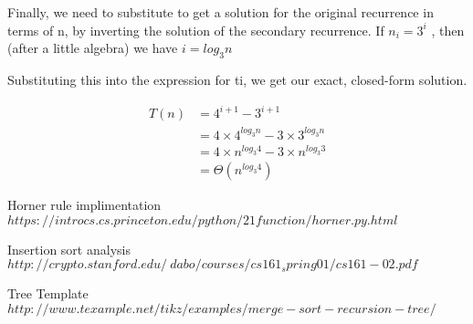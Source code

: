 \documentclass[5pt]{article}
\begin{document}
Finally, we need to substitute to get a solution for the original recurrence in terms of n, by inverting the solution of the secondary recurrence. If $n_i = 3^i $ , then (after a little algebra) we have $ i = log_3 n$

Substituting this into the expression for ti, we get our exact, closed-form solution.

\begin{align*}
T(n)  & = 4^{i+1} - 3^{i+1}  \\
& = 4 \times 4^{log_3 n} - 3 \times 3^{log_3 n} \\
& = 4 \times n^{log_3 4} - 3 \times n^{log_3 3} \\
& = \Theta(n^{log_3 4})
\end{align*}

\clearpage

\begin{thebibliography}{9}
Horner rule implimentation
\\\texttt{$https://introcs.cs.princeton.edu/python/21function/horner.py.html$}
 
Insertion sort analysis
\\\texttt{$http://crypto.stanford.edu/~dabo/courses/cs161_spring01/cs161-02.pdf$}

Tree Template
\\\texttt{$http://www.texample.net/tikz/examples/merge-sort-recursion-tree/$}

\end{thebibliography}
\end{document}
